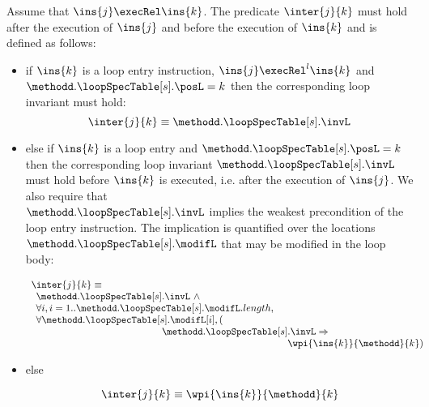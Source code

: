 \begin{defInter}\label{inter} 

Assume that $\ins{j} \execRel \ins{k}$. The predicate $\inter{j}{k}$ must hold after the execution of $\ins{j}$ and before the execution of 
$\ins{k}$ and is defined as follows:
\begin{itemize}
\item if $\ins{k}$ is a loop entry instruction,  $\ins{j} \execRel^l \ins{k}$ and  $ \methodd.\loopSpecTable[s].\posL = k $
then the corresponding loop invariant  must hold:
$$
\inter{j}{k} \equiv  \methodd.\loopSpecTable[s].\invL
$$


\item else if $\ins{k}$  is a loop entry  and  $ \methodd.\loopSpecTable[s].\posL = k $ 
then the corresponding loop invariant $ \methodd.\loopSpecTable[s].\invL$  must hold before $\ins{k}$ is executed, 
i.e. after the execution of $\ins{j}$. We also require that \\
$\methodd.\loopSpecTable[s].\invL$ implies the weakest precondition of the loop entry instruction. 
The implication is quantified over the locations $ \methodd.\loopSpecTable[s].\modifL $ that may be modified in the loop body:

$$\begin{array}{l} \inter{j}{k} \equiv \\ \begin{array}{l}
          \methodd.\loopSpecTable[s].\invL \ \wedge \\
          \forall i , i = 1.. \methodd.\loopSpecTable[s].\modifL.length ,\\
          \forall  \methodd.\loopSpecTable[s].\modifL[i], (\\
	  \phantom{ \methodd.\loopSpecTable[s] }  \methodd.\loopSpecTable[s].\invL \Rightarrow \\
	  \phantom{ \methodd.\loopSpecTable[s]  \methodd.\loopSpecTable[s] } \wpi{\ins{k}}{ \methodd }{k} ) 
 \end{array}
 \end{array}  $$

\item else 

$$\inter{j}{k} \equiv \wpi{ \ins{k }}{\methodd}{k}$$
\end{itemize}
\end{defInter}
